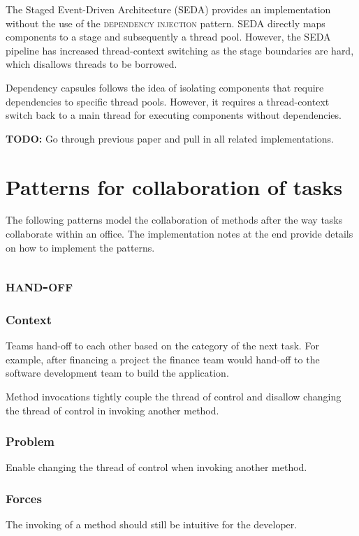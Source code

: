 \documentclass[prodmode]{style/acmlarge}
\begin{document}
The Staged Event-Driven Architecture (SEDA) \cite{seda} provides an
implementation without the use of the \textsc{dependency injection} pattern. 
SEDA directly maps components to a stage and subsequently a thread pool. 
However, the SEDA pipeline has increased thread-context switching as the stage
boundaries are hard, which disallows threads to be borrowed.

Dependency capsules \cite{dependency-capsules} follows the idea of isolating
components that require dependencies to specific thread pools.  However, it
requires a thread-context switch back to a main thread for executing components
without dependencies.

\textbf{TODO:} Go through previous paper and pull in all related implementations. 




\section{Patterns for collaboration of tasks}

The following patterns model the collaboration of methods after the way tasks
collaborate within an office.  The implementation notes at the end provide
details on how to implement the patterns.


\subsection{\textsc{\textbf{hand-off}}}

\subsubsection*{Context} Teams hand-off to each other based on the category of
the next task.  For example, after financing a project the finance team would
hand-off to the software development team to build the application.

Method invocations tightly couple the thread of control and disallow changing
the thread of control in invoking another method.

\subsubsection*{Problem} Enable changing the thread of control when invoking
another method.

\subsubsection*{Forces} The invoking of a method should still be intuitive for
the developer.
\end{document}
